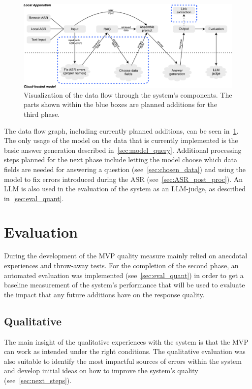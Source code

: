 \documentclass{article}
\begin{document}
\begin{figure}
    \centering
    \includegraphics[width=1\linewidth]{docs/phase2/report/data_flow.pdf}
    \caption{Visualization of the data flow through the system's components. The parts shown within the blue boxes are planned additions for the third phase.}
    \label{fig:data_flow}
\end{figure}

The data flow graph, including currently planned additions, can be seen in~\cref{fig:data_flow}. The only usage of the model on the data that is currently implemented is the basic answer generation described in~\cref{sec:model_query}. Additional processing steps planned for the next phase include letting the model choose which data fields are needed for answering a question (see~\cref{sec:chosen_data}) and using the model to fix errors introduced during the ASR (see~\cref{sec:ASR_post_proc}). An LLM is also used in the evaluation of the system as an LLM-judge, as described in~\cref{sec:eval_quant}.



\section{Evaluation}
During the development of the MVP quality measure mainly relied on anecdotal experiences and throw-away tests. For the completion of the second phase, an automated evaluation was implemented (see~\cref{sec:eval_quant}) in order to get a baseline measurement of the system's performance that will be used to evaluate the impact that any future additions have on the response quality.

\subsection{Qualitative} \label{sec:eval_qual}
The main insight of the qualitative experiences with the system is that the MVP can work as intended under the right conditions. The qualitative evaluation was also suitable to identify the most impactful sources of errors within the system and develop initial ideas on how to improve the system's quality (see~\cref{sec:next_steps}).\\
\end{document}
